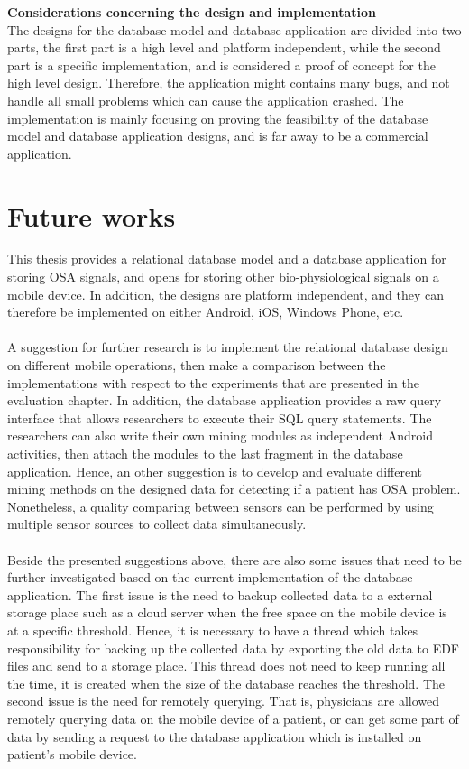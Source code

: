 \textbf{Considerations concerning the design and implementation}\\
The designs for the database model and database application are divided into two parts, the first part is a high level and platform independent, while the second part is a specific implementation, and is considered a proof of concept for the high level design. Therefore, the application might contains many bugs, and not handle all small problems which can cause the application crashed. The implementation is mainly focusing on proving the feasibility of the database model and database application designs, and is far away to be a commercial application.
\section{Future works}
This thesis provides a relational database model and a database application for storing OSA signals, and opens for storing other bio-physiological signals on a mobile device. In addition, the designs are platform independent, and they can therefore be implemented on either Android, iOS, Windows Phone, etc.\\\\
A suggestion for further research is to implement the relational database design on different mobile operations, then make a comparison between the implementations with respect to the experiments that are presented in the evaluation chapter. In addition, the database application provides a raw query interface that allows researchers to execute their SQL query statements. The researchers can also write their own mining modules as independent Android activities, then attach the modules to the last fragment in the database application. Hence, an other suggestion is to develop and evaluate different mining methods on the designed data for detecting if a patient has OSA problem. Nonetheless, a quality comparing between sensors can be performed by using multiple sensor sources to collect data simultaneously.\\\\
Beside the presented suggestions above, there are also some issues that need to be further investigated based on the current implementation of the database application. The first issue is the need to backup collected data to a external storage place such as a cloud server when the free space on the mobile device is at a specific threshold. Hence, it is necessary to have a thread which takes responsibility for backing up the collected data by exporting the old data to EDF files and send to a storage place. This thread does not need to keep running all the time, it is created when the size of the database reaches the threshold. The second issue is the need for remotely querying. That is, physicians are allowed remotely querying data on the mobile device of a patient, or can get some part of data by sending a request to the database application which is installed on patient's mobile device.\\
